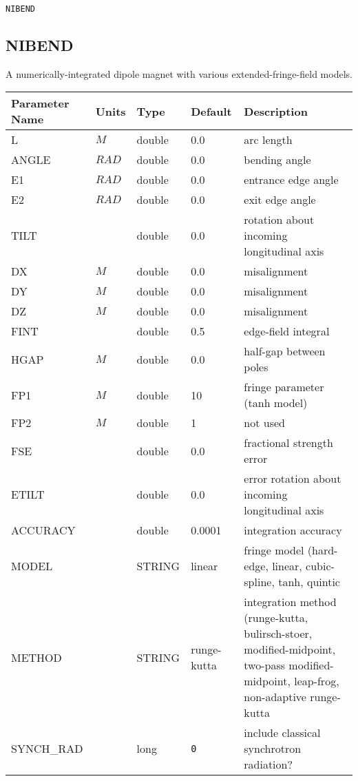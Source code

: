 \begin{latexonly}
\newpage
\begin{center}{\Large\verb|NIBEND|}\end{center}
\end{latexonly}\subsection{NIBEND}
A numerically-integrated dipole magnet with various extended-fringe-field models.
\\
\begin{tabular}{|l|l|l|l|p{\descwidth}|} \hline
Parameter Name & Units & Type & Default & Description \\ \hline 
L & $M$ & double &  0.0 & arc length  \\ \hline 
ANGLE & $RAD$ & double &  0.0 & bending angle  \\ \hline 
E1 & $RAD$ & double &  0.0 & entrance edge angle  \\ \hline 
E2 & $RAD$ & double &  0.0 & exit edge angle  \\ \hline 
TILT &  & double &  0.0 & rotation about incoming longitudinal axis  \\ \hline 
DX & $M$ & double &  0.0 & misalignment  \\ \hline 
DY & $M$ & double &  0.0 & misalignment  \\ \hline 
DZ & $M$ & double &  0.0 & misalignment  \\ \hline 
FINT &  & double &   0.5 & edge-field integral  \\ \hline 
HGAP & $M$ & double &  0.0 & half-gap between poles  \\ \hline 
FP1 & $M$ & double &   10 & fringe parameter (tanh model)  \\ \hline 
FP2 & $M$ & double &   1 & not used  \\ \hline 
FSE &  & double &  0.0 & fractional strength error  \\ \hline 
ETILT &  & double &  0.0 & error rotation about incoming longitudinal axis  \\ \hline 
ACCURACY &  & double &   0.0001 & integration accuracy  \\ \hline 
MODEL &  & STRING &   linear          & fringe model (hard-edge, linear, cubic-spline, tanh, quintic  \\ \hline 
METHOD &  & STRING &   runge-kutta     & integration method (runge-kutta, bulirsch-stoer, modified-midpoint, two-pass modified-midpoint, leap-frog, non-adaptive runge-kutta  \\ \hline 
SYNCH\_RAD &  & long &  \verb|0| & include classical synchrotron radiation?  \\ \hline 
\end{tabular}

